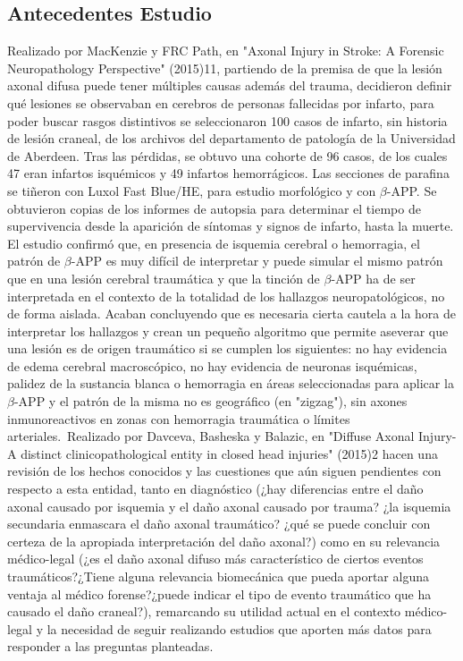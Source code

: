 \subsection{Antecedentes Estudio}
Realizado por MacKenzie y FRC Path, en "Axonal Injury in Stroke: A Forensic Neuropathology Perspective" (2015)11, partiendo de la premisa de que la lesión axonal difusa puede tener múltiples causas además del trauma, decidieron definir qué lesiones se observaban en cerebros de personas fallecidas por infarto, para poder buscar rasgos distintivos se seleccionaron 100 casos de infarto, sin historia de lesión craneal, de los archivos del departamento de patología de la Universidad de Aberdeen. Tras las pérdidas, se obtuvo una cohorte de 96 casos, de los cuales 47 eran infartos isquémicos y 49 infartos hemorrágicos. Las secciones de parafina se tiñeron con Luxol Fast Blue/HE, para estudio morfológico y con $\beta$-APP. Se obtuvieron copias de los informes de autopsia para determinar el tiempo de supervivencia desde la aparición de síntomas y signos de infarto, hasta la muerte. El estudio confirmó que, en presencia de isquemia cerebral o hemorragia, el patrón de $\beta$-APP es muy difícil de interpretar y puede simular el mismo patrón que en una lesión cerebral traumática y que la tinción de $\beta$-APP ha de ser interpretada en el contexto de la totalidad de los hallazgos neuropatológicos, no de forma aislada. Acaban concluyendo que es necesaria cierta cautela a la hora de interpretar los hallazgos y crean un pequeño algoritmo que permite aseverar que una lesión es de origen traumático si se cumplen los siguientes: no hay evidencia de edema cerebral macroscópico, no hay evidencia de neuronas isquémicas, palidez de la sustancia blanca o hemorragia en áreas seleccionadas para aplicar la $\beta$-APP y el patrón de la misma no es geográfico (en "zigzag"), sin axones inmunoreactivos en zonas con hemorragia traumática o límites arteriales.\
Realizado por Davceva, Basheska y Balazic, en "Diffuse Axonal Injury- A distinct clinicopathological entity in closed head injuries" (2015)2 hacen una revisión de los hechos conocidos y las cuestiones que aún siguen pendientes con respecto a esta entidad, tanto en diagnóstico (¿hay diferencias entre el daño axonal causado por isquemia y el daño axonal causado por trauma? ¿la isquemia secundaria enmascara el daño axonal traumático? ¿qué se puede concluir con certeza de la apropiada interpretación del daño axonal?) como en su relevancia médico-legal (¿es el daño axonal difuso más característico de ciertos eventos traumáticos?¿Tiene alguna relevancia biomecánica que pueda aportar alguna ventaja al médico forense?¿puede indicar el tipo de evento traumático que ha causado el daño craneal?), remarcando su utilidad actual en el contexto médico-legal y la necesidad de seguir realizando estudios que aporten más datos para responder a las preguntas planteadas. \

